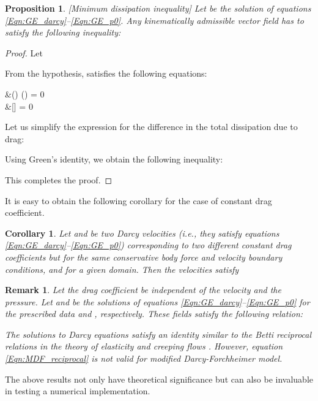 \documentclass[11pt,reqno]{amsart}
\newtheorem{remark}[theorem]{Remark}
\newtheorem{proposition}[theorem]{Proposition}
\newtheorem{corollary}[theorem]{Corollary}
\begin{document}
\begin{proposition}{[Minimum dissipation inequality]}
  Let  be the solution of equations 
  \eqref{Eqn:GE_darcy}--\eqref{Eqn:GE_p0}. 
  Any kinematically admissible vector field 
   has 
  to satisfy the following inequality:
  
\end{proposition}
\begin{proof}
  Let 
  
From the hypothesis,  
  satisfies the following equations:
  
      &\delta {}() \cdot {} 
      () = 0 \quad \forall {} \in \partial 
      \Omega \\
&[\delta {}] = 0 \quad 
      \forall {} \in \Omega 
    
Let us simplify the expression for the difference 
  in the total dissipation due to drag:
  
Using Green's identity, we obtain the following inequality:
  
This completes the proof.
\end{proof}
It is easy to obtain the following corollary for 
the case of constant drag coefficient.
\begin{corollary}
  Let  and  
  be two Darcy velocities (i.e., they satisfy equations 
  \eqref{Eqn:GE_darcy}--\eqref{Eqn:GE_p0}) corresponding 
  to two different \emph{constant} drag coefficients but 
  for the same conservative body force and velocity 
  boundary conditions, and for a given domain. Then 
  the velocities satisfy 
  
\end{corollary}
\begin{remark}
  Let the drag coefficient be independent of 
  the velocity and the pressure. Let  and  be the solutions of equations 
  \eqref{Eqn:GE_darcy}--\eqref{Eqn:GE_p0} for the 
  prescribed data  and , respectively. 
  These fields satisfy the following relation:

The solutions to Darcy equations satisfy an identity 
  similar to the Betti reciprocal relations in the 
  theory of elasticity \cite{Sadd,Truesdell_Noll} 
  and creeping flows \cite{Guazzelli_Morris}.
However, equation \eqref{Eqn:MDF_reciprocal} is 
  not valid for modified Darcy-Forchheimer model. 
\end{remark}
The above results not only have theoretical significance 
but can also be invaluable in testing a numerical 
implementation.
 
\end{document}
